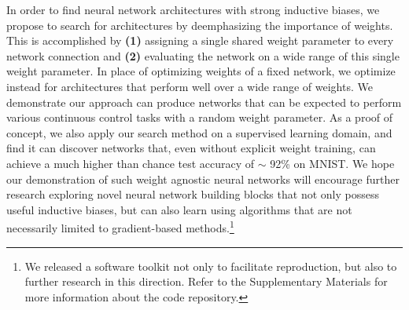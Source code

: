 In order to find neural network architectures with strong inductive biases, we propose to search for architectures by deemphasizing the importance of weights. This is accomplished by \textbf{(1)} assigning a single shared weight parameter to every network connection and \textbf{(2)} evaluating the network on a wide range of this single weight parameter. In place of optimizing weights of a fixed network, we optimize instead for architectures that perform well over a wide range of weights. We demonstrate our approach can produce networks that can be expected to perform various continuous control tasks with a random weight parameter. As a proof of concept, we also apply our search method on a supervised learning domain, and find it can discover networks that, even without explicit weight training, can achieve a much higher than chance test accuracy of $\sim$ 92\% on MNIST.
%
We hope our demonstration of such weight agnostic neural networks will encourage further research exploring novel neural network building blocks that not only possess useful inductive biases, but can also learn using algorithms that are not necessarily limited to gradient-based methods.\footnote{We released a software toolkit not only to facilitate reproduction, but also to further research in this direction. Refer to the Supplementary Materials for more information about the code repository.
}
